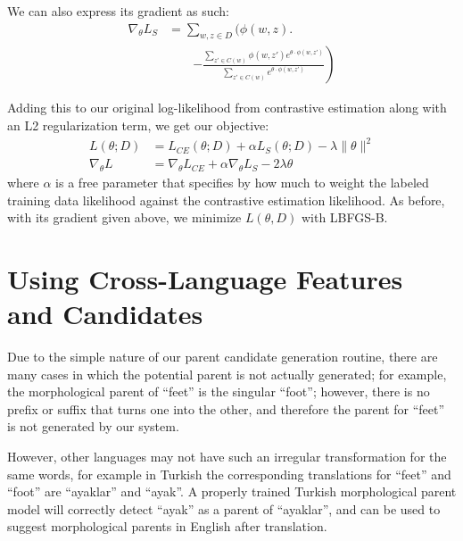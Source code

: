 \documentclass[11pt,twocolumn]{article}
\begin{document}
We can also express its gradient as such:
\begin{equation}
    \begin{split}
        \nabla_\theta L_S &= \sum_{w, z \in D} \Bigg(\phi(w, z) \Bigg. \\
                          &\qquad\left. - \frac{\sum_{z' \in C(w)} \phi(w, z') e^{\theta \cdot \phi(w, z')} }{\sum_{z' \in C(w)} e^{\theta \cdot \phi(w, z')}}\right)
    \end{split}
\end{equation}

Adding this to our original log-likelihood from contrastive estimation
along with an L2 regularization term, we get our objective:
\begin{equation}
    \begin{split}
        L(\theta; D) &= L_{CE}(\theta; D) + \alpha L_S(\theta; D) - \lambda \| \theta \|^2 \\
        \nabla_\theta L &= \nabla_\theta L_{CE} + \alpha \nabla_\theta L_S - 2\lambda \theta
    \end{split}
\end{equation}
where $\alpha$ is a free parameter that specifies by how much to weight the labeled training data likelihood
against the contrastive estimation likelihood.
As before, with its gradient given above, we minimize $L(\theta, D)$ with LBFGS-B.

\section{Using Cross-Language Features and Candidates}
Due to the simple nature of our parent candidate generation routine,
there are many cases in which the potential parent is not actually generated;
for example, the morphological parent of ``feet'' is the singular ``foot'';
however, there is no prefix or suffix that turns one into the other, and
therefore the parent for ``feet'' is not generated by our system.

However, other languages may not have such an irregular transformation
for the same words, for example in Turkish the corresponding translations
for ``feet'' and ``foot'' are ``ayaklar'' and ``ayak''. A properly trained Turkish
morphological parent model will correctly detect ``ayak'' as a parent of ``ayaklar'',
and can be used to suggest morphological parents in English after translation.
\end{document}
